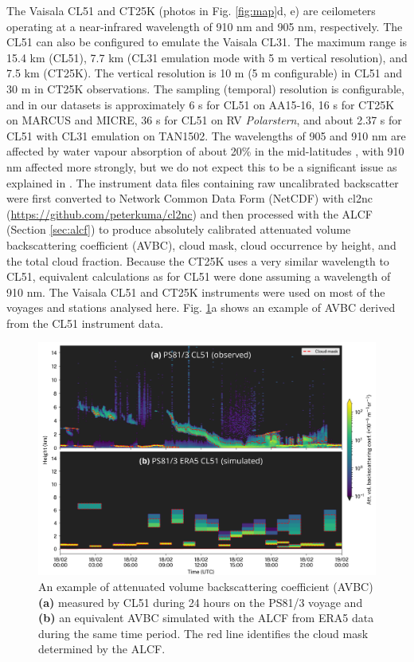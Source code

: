 \documentclass[draft]{agujournal2019}
\begin{document}
The Vaisala CL51 and CT25K (photos in Fig. \ref{fig:map}d, e) are ceilometers
operating at a near-infrared wavelength of 910 nm and 905 nm, respectively.
The CL51 can also be configured to emulate the Vaisala CL31. The maximum range
is 15.4 km (CL51), 7.7 km (CL31 emulation mode with 5 m vertical resolution),
and 7.5 km (CT25K). The vertical resolution is 10 m (5 m configurable) in CL51
and 30 m in CT25K observations. The sampling (temporal) resolution is
configurable, and in our datasets is approximately 6 s for CL51 on AA15‐16, 16
s for CT25K on MARCUS and MICRE, 36 s for CL51 on RV \emph{Polarstern}, and
about 2.37 s for CL51 with CL31 emulation on TAN1502. The wavelengths of 905
and 910 nm are affected by water vapour absorption of about 20\% in the
mid-latitudes , with 910 nm affected more
strongly, but we do not expect this to be a significant issue as explained in
.  The instrument data files containing raw uncalibrated
backscatter were first converted to Network Common Data Form (NetCDF) with
cl2nc (\url{https://github.com/peterkuma/cl2nc}) and then processed with the
ALCF (Section \ref{sec:alcf}) to produce absolutely calibrated attenuated
volume backscattering coefficient (AVBC), cloud mask, cloud occurrence by
height, and the total cloud fraction. Because the CT25K uses a very similar
wavelength to CL51, equivalent calculations as for CL51 were done assuming a
wavelength of 910 nm. The Vaisala CL51 and CT25K instruments were used on most
of the voyages and stations analysed here. Fig.  \ref{fig:example}a shows an
example of AVBC derived from the CL51 instrument data.

\begin{figure}[b!]
\centering
\includegraphics[width=\textwidth]{img/example.png}
\caption{
An example of attenuated volume backscattering coefficient (AVBC) \textbf{(a)}
measured by CL51 during 24 hours on the PS81/3 voyage and \textbf{(b)} an
equivalent AVBC simulated with the ALCF from ERA5 data during the same time
period. The red line identifies the cloud mask determined by the ALCF.
}
\label{fig:example}
\end{figure}
\end{document}
